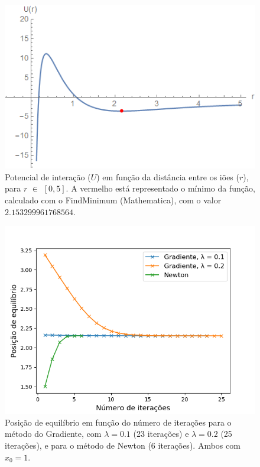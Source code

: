 \documentclass[aps,pre,twocolumn,showpacs,amsmath,amssymb]{revtex4-1}
\begin{document}
\begin{figure}[hbt!]\vspace{-7ex}
    \begin{center}
    \includegraphics[width=\columnwidth]{2a.png}
    \caption{Potencial de interação ($U$) em função da distância entre os iões ($r$), para $r$ $\in$ $[0,5]$. A vermelho está representado o mínimo da função, calculado com o FindMinimum (Mathematica), com o valor $2.153299961768564$.}
    \end{center}
\end{figure}

\begin{figure}[hbt!]\vspace{-4ex}
    \begin{center}
    \includegraphics[width=\columnwidth]{2d_2.png}
    \caption{Posição de equilíbrio em função do número de iterações para o método do Gradiente, com $\lambda = 0.1$ (23 iterações) e $\lambda = 0.2$ (25 iterações), e para o método de Newton (6 iterações). Ambos com $x_0=1$.}
    \end{center}
\end{figure}
\end{document}
